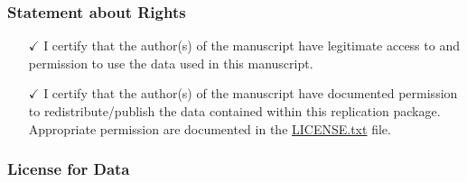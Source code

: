\documentclass[10pt]{article}
\providecommand{\tightlist}{%
  \setlength{\itemsep}{0pt}\setlength{\parskip}{0pt}}
\begin{document}

\hypertarget{statement-about-rights}{%
\subsubsection{Statement about Rights}\label{statement-about-rights}}

\begin{itemize}
\tightlist
\item[$\checkmark$]
  I certify that the author(s) of the manuscript have legitimate access
  to and permission to use the data used in this manuscript.
\item[$\checkmark$]
  I certify that the author(s) of the manuscript have documented
  permission to redistribute/publish the data contained within this
  replication package. Appropriate permission are documented in the
  \href{https://social-science-data-editors.github.io/template_README/LICENSE.txt}{LICENSE.txt}
  file.
\end{itemize}

\hypertarget{optional-but-recommended-license-for-data}{%
\subsubsection{License for
Data}\label{optional-but-recommended-license-for-data}}

\end{document}
